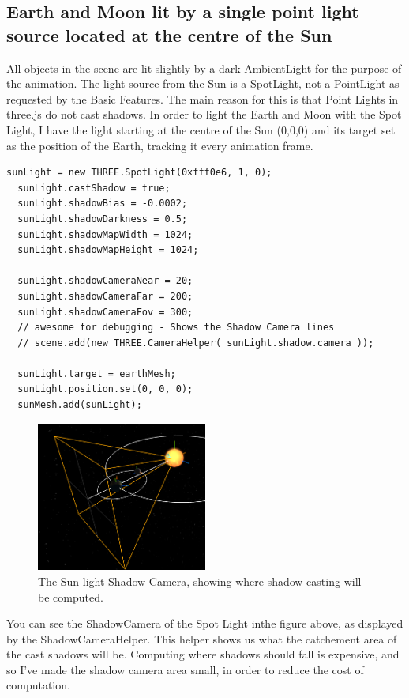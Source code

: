 \documentclass[12pt]{article}
\begin{document}
\subsection{Earth and Moon lit by a single point light source located at the centre of the Sun}
All objects in the scene are lit slightly by a dark AmbientLight for the purpose of the animation. The light source from the Sun is a SpotLight, not a PointLight as requested by the Basic Features. The main reason for this is that Point Lights in three.js do not cast shadows. In order to light the Earth and Moon with the Spot Light, I have the light starting at the centre of the Sun (0,0,0) and its target set as the position of the Earth, tracking it every animation frame.
\begin{lstlisting}
sunLight = new THREE.SpotLight(0xfff0e6, 1, 0);
  sunLight.castShadow = true;
  sunLight.shadowBias = -0.0002;
  sunLight.shadowDarkness = 0.5;
  sunLight.shadowMapWidth = 1024;
  sunLight.shadowMapHeight = 1024;

  sunLight.shadowCameraNear = 20;
  sunLight.shadowCameraFar = 200;
  sunLight.shadowCameraFov = 300;
  // awesome for debugging - Shows the Shadow Camera lines
  // scene.add(new THREE.CameraHelper( sunLight.shadow.camera ));

  sunLight.target = earthMesh;    
  sunLight.position.set(0, 0, 0);
  sunMesh.add(sunLight);
\end{lstlisting}

\begin{figure}[H]
        \centering
       
                \includegraphics[width=0.5\textwidth]{images/shadowcamera}
                \caption{The Sun light Shadow Camera, showing where shadow casting will be computed.}
                \label{fig: The Shadow Camera.}
      
\end{figure}

You can see the ShadowCamera of the Spot Light inthe figure above, as displayed by the ShadowCameraHelper. This helper shows us what the catchement area of the cast shadows will be. Computing where shadows should fall is expensive, and so I've made the shadow camera area small, in order to reduce the cost of computation.
\end{document}
